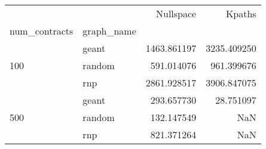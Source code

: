 \begin{tabular}{llrr}
\toprule
 &  & Nullspace & Kpaths \\
num_contracts & graph_name &  &  \\
\midrule
\multirow[t]{3}{*}{100} & geant & 1463.861197 & 3235.409250 \\
 & random & 591.014076 & 961.399676 \\
 & rnp & 2861.928517 & 3906.847075 \\
\cline{1-4}
\multirow[t]{3}{*}{500} & geant & 293.657730 & 28.751097 \\
 & random & 132.147549 & NaN \\
 & rnp & 821.371264 & NaN \\
\cline{1-4}
\bottomrule
\end{tabular}
